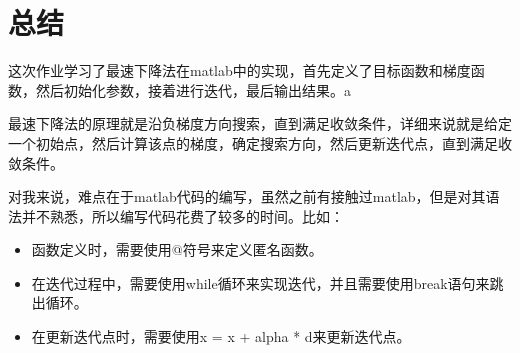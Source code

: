 \documentclass[12pt,a4paper,oneside]{article}
\begin{document}
\section{总结}
这次作业学习了最速下降法在matlab中的实现，首先定义了目标函数和梯度函数，然后初始化参数，接着进行迭代，最后输出结果。a

最速下降法的原理就是沿负梯度方向搜索，直到满足收敛条件，详细来说就是给定一个初始点，然后计算该点的梯度，确定搜索方向，然后更新迭代点，直到满足收敛条件。

对我来说，难点在于matlab代码的编写，虽然之前有接触过matlab，但是对其语法并不熟悉，所以编写代码花费了较多的时间。比如：
\begin{itemize}
    \item 函数定义时，需要使用@符号来定义匿名函数。
    \item 在迭代过程中，需要使用while循环来实现迭代，并且需要使用break语句来跳出循环。
    \item 在更新迭代点时，需要使用x = x + alpha * d来更新迭代点。
\end{itemize}
\end{document}
